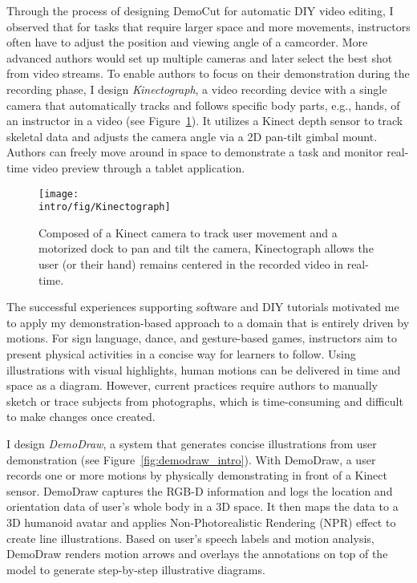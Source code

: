 Through the process of designing DemoCut for automatic DIY video editing, I observed that for tasks that require larger space and more movements, instructors often have to adjust the position and viewing angle of a camcorder. More advanced authors would set up multiple cameras and later select the best shot from video streams.
%
To enable authors to focus on their demonstration during the recording phase, I design \emph{Kinectograph}, a video recording device with a single camera that automatically tracks and follows specific body parts, e.g., hands, of an instructor in a video (see Figure~\ref{fig:kinectograph_intro}). It utilizes a Kinect depth sensor to track skeletal data and adjusts the camera angle via a 2D pan-tilt gimbal mount. Authors can freely move around in space to demonstrate a task and monitor real-time video preview through a tablet application.

\begin{figure}[!t]
  \centering
  \texttt{[image: \\intro/fig/Kinectograph]}
  \caption{Composed of a Kinect camera to track user movement and a motorized dock to pan and tilt the camera, Kinectograph allows the user (or their hand) remains centered in the recorded video in real-time.}
\label{fig:kinectograph_intro}
\end{figure}


The successful experiences supporting software and DIY tutorials motivated me to apply my demonstration-based approach to a domain that is entirely driven by motions. For sign language, dance, and gesture-based games, instructors aim to present physical activities in a concise way for learners to follow. Using illustrations with visual highlights, human motions can be delivered in time and space as a diagram. However, current practices require authors to manually sketch or trace subjects from photographs, which is time-consuming and difficult to make changes once created.

I design \emph{DemoDraw}, a system that generates concise illustrations from user demonstration (see Figure~\ref{fig:demodraw_intro}). With DemoDraw, a user records one or more motions by physically demonstrating in front of a Kinect sensor. DemoDraw captures the RGB-D information and logs the location and orientation data of user's whole body in a 3D space. It then maps the data to a 3D humanoid avatar and applies Non-Photorealistic Rendering (NPR) effect to create line illustrations. Based on user's speech labels and motion analysis, DemoDraw renders motion arrows and overlays the annotations on top of the model to generate step-by-step illustrative diagrams.


